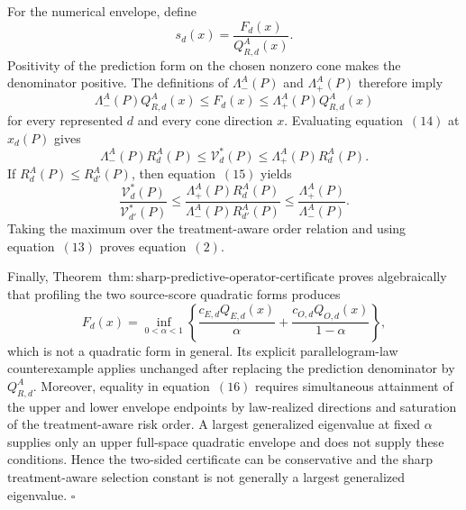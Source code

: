 For the numerical envelope, define
\[
 s_d(x)=\frac{F_d(x)}{Q_{R,d}^A(x)}.
\]
Positivity of the prediction form on the chosen nonzero cone makes the denominator positive.  The definitions of \(\Lambda_-^A(P)\) and \(\Lambda_+^A(P)\) therefore imply
\[
 \Lambda_-^A(P)Q_{R,d}^A(x)
 \le F_d(x)
 \le\Lambda_+^A(P)Q_{R,d}^A(x)                          \tag{14}
\]
for every represented \(d\) and every cone direction \(x\).  Evaluating equation~\((14)\) at \(x_d(P)\) gives
\[
 \Lambda_-^A(P)R_d^A(P)
 \le\mathcal V_d^*(P)
 \le\Lambda_+^A(P)R_d^A(P).                              \tag{15}
\]
If \(R_d^A(P)\le R_{d'}^A(P)\), then equation~\((15)\) yields
\[
 \frac{\mathcal V_d^*(P)}{\mathcal V_{d'}^*(P)}
 \le
 \frac{\Lambda_+^A(P)R_d^A(P)}
      {\Lambda_-^A(P)R_{d'}^A(P)}
 \le\frac{\Lambda_+^A(P)}{\Lambda_-^A(P)}.              \tag{16}
\]
Taking the maximum over the treatment-aware order relation and using equation~\((13)\) proves equation~\((2)\).

Finally, Theorem~\(\mathrm{thm{:}sharp\text{-}predictive\text{-}operator\text{-}certificate}\) proves algebraically that profiling the two source-score quadratic forms produces
\[
 F_d(x)=\inf_{0<\alpha<1}
 \left\{
 \frac{c_{E,d}Q_{E,d}(x)}\alpha+
 \frac{c_{O,d}Q_{O,d}(x)}{1-\alpha}
 \right\},                                                \tag{17}
\]
which is not a quadratic form in general.  Its explicit parallelogram-law counterexample applies unchanged after replacing the prediction denominator by \(Q_{R,d}^A\).  Moreover, equality in equation~\((16)\) requires simultaneous attainment of the upper and lower envelope endpoints by law-realized directions and saturation of the treatment-aware risk order.  A largest generalized eigenvalue at fixed \(\alpha\) supplies only an upper full-space quadratic envelope and does not supply these conditions.  Hence the two-sided certificate can be conservative and the sharp treatment-aware selection constant is not generally a largest generalized eigenvalue. \(\square\)